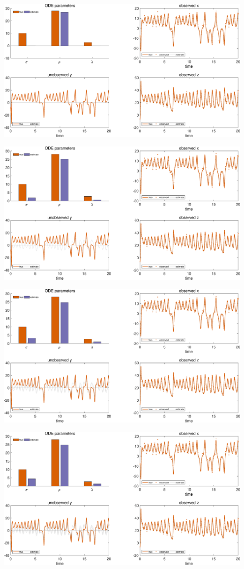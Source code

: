 {\centering
\includegraphics [width=5in]{VGM_for_Lorenz_Attractor_02.eps}

\includegraphics [width=5in]{VGM_for_Lorenz_Attractor_03.eps}

\includegraphics [width=5in]{VGM_for_Lorenz_Attractor_04.eps}

\includegraphics [width=5in]{VGM_for_Lorenz_Attractor_05.eps}

}
